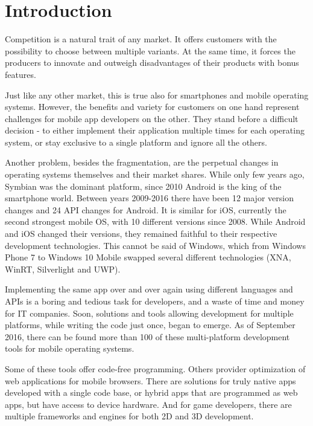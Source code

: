 \documentclass[english,master,public,dept460,male,cpdeclaration,oneside]{diploma}
\begin{document}
\MakeTitlePages

\lstlistoflistings

\section{Introduction}
Competition is a natural trait of any market. It offers customers with the possibility to choose between multiple variants. At the same time, it forces the producers to innovate and outweigh disadvantages of their products with bonus features. 

Just like any other market, this is true also for smartphones and mobile operating systems. However, the benefits and variety for customers on one hand represent challenges for mobile app developers on the other. They stand before a difficult decision - to either implement their application multiple times for each operating system, or stay exclusive to a single platform and ignore all the others.

Another problem, besides the fragmentation, are the perpetual changes in operating systems themselves and their market shares. While only few years ago, Symbian was the dominant platform, since 2010 Android is the king of the smartphone world. Between years 2009-2016 there have been 12 major version changes and 24 API changes for Android. It is similar for iOS, currently the second strongest mobile OS, with 10 different versions since 2008. While Android and iOS changed their versions, they remained faithful to their respective development technologies. This cannot be said of Windows, which from Windows Phone 7 to Windows 10 Mobile swapped several different technologies (XNA, WinRT, Silverlight and UWP).

Implementing the same app over and over again using different languages and APIs is a boring and tedious task for developers, and a waste of time and money for IT companies. Soon, solutions and tools allowing development for multiple platforms, while writing the code just once, began to emerge. As of September 2016, there can be found more than 100 of these multi-platform development tools for mobile operating systems.

Some of these tools offer code-free programming. Others provider optimization of web applications for mobile browsers. There are solutions for truly native apps developed with a single code base, or hybrid apps that are programmed as web apps, but have access to device hardware. And for game developers, there are multiple frameworks and engines for both 2D and 3D development. 
\end{document}
